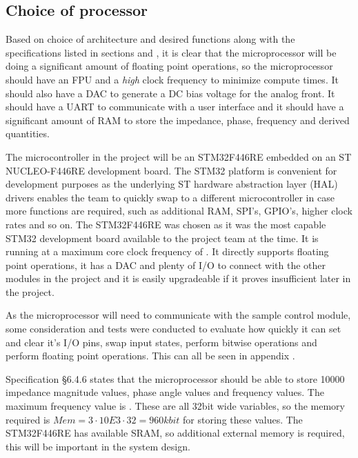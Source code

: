 \subsection{Choice of processor} \label{subsec:MainProcessorChoice}

Based on choice of architecture and desired functions along with the specifications listed in sections  and , it is clear that the microprocessor will be doing a significant amount of floating point operations, so the microprocessor should have an FPU and a \textit{high} clock frequency to minimize compute times. It should also have a DAC to generate a DC bias voltage for the analog front. It should have a UART to communicate with a user interface and it should have a significant amount of RAM to store the impedance, phase, frequency and derived quantities. 

The microcontroller in the project will be an STM32F446RE\cite{ST_STM32F446RE} embedded on an ST NUCLEO-F446RE\cite{ST_NUCLEOF446RE} development board. The STM32 platform is convenient for development purposes as the underlying ST hardware abstraction layer (HAL) drivers enables the team to quickly swap to a different microcontroller in case more functions are required, such as additional RAM, SPI's, GPIO's, higher clock rates and so on. The STM32F446RE was chosen as it was the most capable STM32 development board available to the project team at the time. It is running at a maximum core clock frequency of . It directly supports floating point operations, it has a DAC and plenty of I/O to connect with the other modules in the project and it is easily upgradeable if it proves insufficient later in the project.

As the microprocessor will need to communicate with the sample control module, some consideration and tests were conducted  to evaluate how quickly it can set and clear it's I/O pins, swap input states, perform bitwise operations and perform floating point operations. This can all be seen in appendix .

Specification §6.4.6 states that the microprocessor should be able to store 10000 impedance magnitude values, phase angle values and frequency values. The maximum frequency value is . These are all 32bit wide variables, so the memory required is $Mem = 3\cdot 10E3 \cdot 32 = 960 kbit$ for storing these values. The STM32F446RE has  available SRAM, so additional external memory is required, this will be important in the system design.

